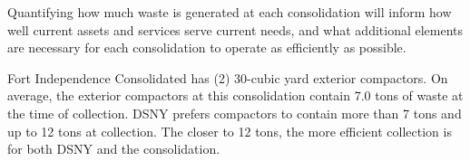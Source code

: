 
    Quantifying how much waste is generated at each consolidation will inform how well current assets and services serve current needs, and what additional elements are necessary for each consolidation to operate as efficiently as possible.
    
    Fort Independence Consolidated has (2) 30-cubic yard exterior compactors. On average, the exterior compactors at this consolidation contain 7.0 tons of waste at the time of collection. DSNY prefers compactors to contain more than 7 tons and up to 12 tons at collection. The closer to 12 tons, the more efficient collection is for both DSNY and the consolidation.